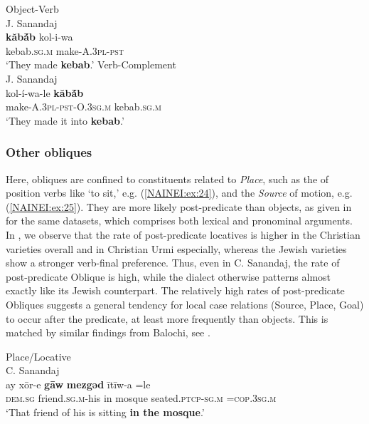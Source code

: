 \documentclass[output=paper,colorlinks,citecolor=brown,draftmode]{langscibook}
\begin{document}
\ea
\ea\label{NAINEI:ex:23a}
Object-Verb\\
J. Sanandaj \citep[B:\S 35]{Khan2009JSana} \\
\gll \textbf{kăbā́b} kol-i-wa  \\
     kebab\textsc{.sg.m} make\textsc{-A.3pl-pst} \\
\glt `They made \textbf{kebab}.'
\ex\label{NAINEI:ex:23b}
Verb-Complement\\
J. Sanandaj \citep[B:\S 35]{Khan2009JSana} \\
\gll kol-í-wa-le \textbf{kăbā́b}   \\
     make\textsc{-A.3pl-pst-O.3sg.m} kebab\textsc{.sg.m} \\
\glt `They made it into \textbf{kebab}.'
\z
\z

\subsubsection{Other obliques}
Here, obliques are confined to constituents related to \textit{Place}, such as the   of position verbs like `to sit,' e.g. (\ref{NAINEI:ex:24}), and the \textit{Source} of motion, e.g. (\ref{NAINEI:ex:25}). They are more likely post-predicate than objects, as given in  for the same datasets, which comprises both lexical and pronominal arguments. In , we observe that the rate of post-predicate locatives is higher in the Christian varieties overall and in Christian Urmi especially, whereas the Jewish varieties show a stronger verb-final preference. Thus, even in C. Sanandaj, the rate of post-predicate Oblique is high, while the dialect otherwise patterns almost exactly like its Jewish counterpart. The relatively high rates of post-predicate Obliques suggests a general tendency for local case relations (Source, Place, Goal) to occur after the predicate, at least more frequently than objects. This is matched by similar findings from Balochi, see .


\ea\label{NAINEI:ex:24}
Place/Locative\\
C. Sanandaj \citep[4:\S 11]{Panoussi1990Senaya} \\
\gll ay xōr-e \textbf{gāw} \textbf{mezgəd} ītīw-a =le \\
     \textsc{dem.sg} friend\textsc{.sg.m-}his in mosque seated\textsc{.ptcp-sg.m} \textsc{=cop.3sg.m} \\
\glt `That friend of his is sitting \textbf{in the mosque}.'
\z
\end{document}
